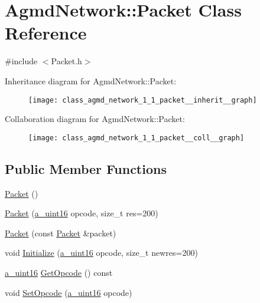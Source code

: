 \hypertarget{class_agmd_network_1_1_packet}{\section{Agmd\+Network\+:\+:Packet Class Reference}
\label{class_agmd_network_1_1_packet}
}


{\ttfamily \#include $<$Packet.\+h$>$}



Inheritance diagram for Agmd\+Network\+:\+:Packet\+:\nopagebreak
\begin{figure}[H]
\begin{center}
\leavevmode
\texttt{[image: class\_agmd\_network\_1\_1\_packet\_\_inherit\_\_graph]}
\end{center}
\end{figure}


Collaboration diagram for Agmd\+Network\+:\+:Packet\+:\nopagebreak
\begin{figure}[H]
\begin{center}
\leavevmode
\texttt{[image: class\_agmd\_network\_1\_1\_packet\_\_coll\_\_graph]}
\end{center}
\end{figure}
\subsection*{Public Member Functions}
\begin{DoxyCompactItemize}
\item 
\hyperlink{class_agmd_network_1_1_packet_af499377e77dd1a35a7a76f5b48996725}{Packet} ()
\item 
\hyperlink{class_agmd_network_1_1_packet_a5eac77c0bb474bc5a6d36c02e471fefb}{Packet} (\hyperlink{_common_defines_8h_a7e7afab9b2de210021aed9953c6b367f}{a\+\_\+uint16} opcode, size\+\_\+t res=200)
\item 
\hyperlink{class_agmd_network_1_1_packet_a88cb2551f2eb849869ec44f3ba4df23b}{Packet} (const \hyperlink{class_agmd_network_1_1_packet}{Packet} \&packet)
\item 
void \hyperlink{class_agmd_network_1_1_packet_af629110ff49c84bf8e3c57c800e31fec}{Initialize} (\hyperlink{_common_defines_8h_a7e7afab9b2de210021aed9953c6b367f}{a\+\_\+uint16} opcode, size\+\_\+t newres=200)
\item 
\hyperlink{_common_defines_8h_a7e7afab9b2de210021aed9953c6b367f}{a\+\_\+uint16} \hyperlink{class_agmd_network_1_1_packet_a4b7d742e39bae80008380be6e4a51dc0}{Get\+Opcode} () const 
\item 
void \hyperlink{class_agmd_network_1_1_packet_a0717ff71886722e606b4c9feef5c0d6d}{Set\+Opcode} (\hyperlink{_common_defines_8h_a7e7afab9b2de210021aed9953c6b367f}{a\+\_\+uint16} opcode)
\end{DoxyCompactItemize}
